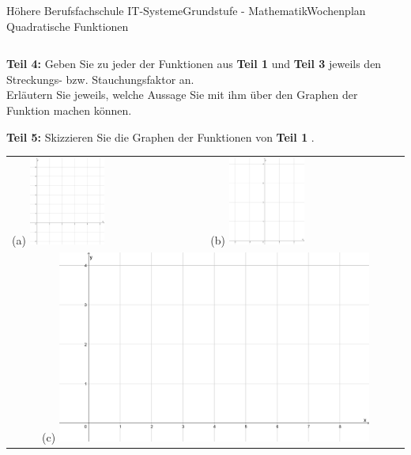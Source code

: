 \documentclass[oneside,openany,headings=optiontotoc,11pt,numbers=noenddot]{scrreprt}
\begin{document}
\begin{worksheet}{Höhere Berufsfachschule IT-Systeme}{Grundstufe - Mathematik}{Wochenplan Quadratische Funktionen}
\begin{framed}
\begin{tabularx}{\textwidth}{XXX}
			\end{tabularx}
		\end{framed}
		\begin{framed}
			\noindent
			\textbf{Teil 4:} Geben Sie zu jeder der Funktionen aus \textbf{Teil 1} und \textbf{Teil 3} jeweils den Streckungs- bzw. Stauchungsfaktor an.\\
			Erläutern Sie jeweils, welche Aussage Sie mit ihm über den Graphen der Funktion machen können.
		\end{framed}
		\newpage
		\begin{framed}
			\noindent
			\textbf{Teil 5:} Skizzieren Sie die Graphen der Funktionen von \textbf{Teil 1} .\\
			\begin{tabularx}{\textwidth}{XX}
				(a) \includegraphics[width=0.4\textwidth, align=t]{../99_Bilder/WP5DiA.jpg} & (b) \includegraphics[width=0.4\textwidth, align=t]{../99_Bilder/WP5DiB.jpg}\\
				\multicolumn{2}{c}{(c) \includegraphics[width=0.8\textwidth, align=t]{../99_Bilder/WP5DiC.jpg}}
			\end{tabularx}
		\end{framed}
	\end{worksheet}
\end{document}
